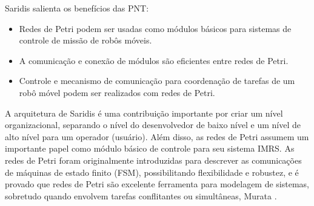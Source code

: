 


Saridis salienta os benefícios das PNT:
\begin{itemize}
  \item Redes de Petri podem ser usadas como módulos básicos para sistemas de
  controle de missão de robôs móveis.
  \item A comunicação e conexão de módulos são eficientes entre redes de Petri.
  \item Controle e mecanismo de comunicação para coordenação de tarefas de um
  robô móvel podem ser realizados com redes de Petri.
\end{itemize} 

A arquitetura de Saridis é uma contribuição importante por criar um nível
organizacional, separando o nível do desenvolvedor de baixo nível e um
nível de alto nível para um operador (usuário). Além disso, as redes de Petri
assumem um importante papel como módulo básico de controle para seu sistema
IMRS. As redes de Petri foram originalmente introduzidas para descrever as
comunicações de máquinas de estado finito (FSM), possibilitando flexibilidade
e robustez, e é provado que redes de Petri são excelente ferramenta para
modelagem de sistemas, sobretudo quando envolvem tarefas conflitantes ou
simultâneas, Murata \cite{murata1989petri}.


